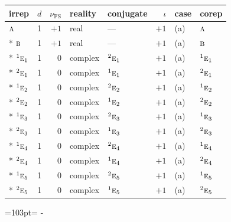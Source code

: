 \documentclass[10pt,a4paper]{article}
\newcommand{\needspace}[1]{\par\penalty-100\begingroup\dimen0=#1\relax\dimen2=\pagegoal
  \advance\dimen2-\pagetotal\ifdim\dimen0>\dimen2\relax\ifdim\dimen2>0pt\vfil\break\fi\fi
  \endgroup}
\numberwithin{equation}{section}
\newcommand{\irr}[1]{\text{\normalfont\scshape #1}}
\newcommand{\conjpair}[1]{{}^{#1}}
\newcommand{\fsind}{\nu_{\mathrm{FS}}}
\begin{document}
{\small\renewcommand{\arraystretch}{1.25}\setlength{\tabcolsep}{4pt}\begin{longtable}{@{}lrrllrll@{}}\toprule
irrep & $d$ & $\fsind$ & reality & conjugate & $\iota$ & case & corep\\\midrule\endhead
\bottomrule\endfoot\endlastfoot
$\irr{a}$ & 1 & $+1$ & real & --- & $+1$ & (a) & $\irr{a}$\\*
$\irr{b}$ & 1 & $+1$ & real & --- & $+1$ & (a) & $\irr{b}$\\*
$\conjpair{1}\irr{e}_{1}$ & 1 & $0$ & complex & $\conjpair{2}\irr{e}_{1}$ & $+1$ & (a) & $\conjpair{1}\irr{e}_{1}$\\*
$\conjpair{2}\irr{e}_{1}$ & 1 & $0$ & complex & $\conjpair{1}\irr{e}_{1}$ & $+1$ & (a) & $\conjpair{2}\irr{e}_{1}$\\*
$\conjpair{1}\irr{e}_{2}$ & 1 & $0$ & complex & $\conjpair{2}\irr{e}_{2}$ & $+1$ & (a) & $\conjpair{1}\irr{e}_{2}$\\*
$\conjpair{2}\irr{e}_{2}$ & 1 & $0$ & complex & $\conjpair{1}\irr{e}_{2}$ & $+1$ & (a) & $\conjpair{2}\irr{e}_{2}$\\*
$\conjpair{1}\irr{e}_{3}$ & 1 & $0$ & complex & $\conjpair{2}\irr{e}_{3}$ & $+1$ & (a) & $\conjpair{1}\irr{e}_{3}$\\*
$\conjpair{2}\irr{e}_{3}$ & 1 & $0$ & complex & $\conjpair{1}\irr{e}_{3}$ & $+1$ & (a) & $\conjpair{2}\irr{e}_{3}$\\*
$\conjpair{1}\irr{e}_{4}$ & 1 & $0$ & complex & $\conjpair{2}\irr{e}_{4}$ & $+1$ & (a) & $\conjpair{1}\irr{e}_{4}$\\*
$\conjpair{2}\irr{e}_{4}$ & 1 & $0$ & complex & $\conjpair{1}\irr{e}_{4}$ & $+1$ & (a) & $\conjpair{2}\irr{e}_{4}$\\*
$\conjpair{1}\irr{e}_{5}$ & 1 & $0$ & complex & $\conjpair{2}\irr{e}_{5}$ & $+1$ & (a) & $\conjpair{1}\irr{e}_{5}$\\*
$\conjpair{2}\irr{e}_{5}$ & 1 & $0$ & complex & $\conjpair{1}\irr{e}_{5}$ & $+1$ & (a) & $\conjpair{2}\irr{e}_{5}$\\
\bottomrule\end{longtable}}
\needspace{103pt}
\end{document}

